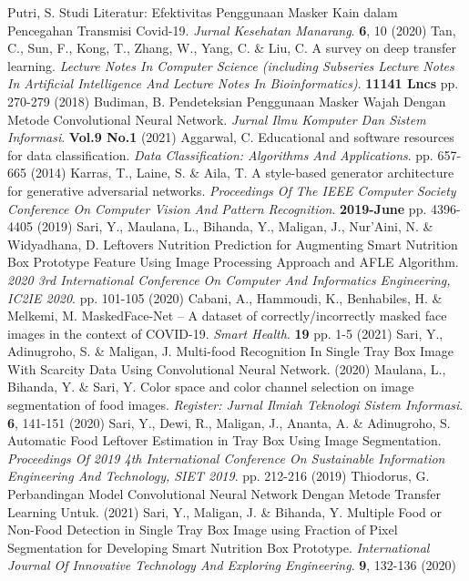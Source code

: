 \documentclass{article}
\begin{document}
\begin{thebibliography}{1}
	Putri, S. Studi Literatur: Efektivitas Penggunaan Masker Kain dalam Pencegahan Transmisi Covid-19. {\em Jurnal Kesehatan Manarang}. \textbf{6}, 10 (2020)
	Tan, C., Sun, F., Kong, T., Zhang, W., Yang, C. \& Liu, C. A survey on deep transfer learning. {\em Lecture Notes In Computer Science (including Subseries Lecture Notes In Artificial Intelligence And Lecture Notes In Bioinformatics)}. \textbf{11141 Lncs} pp. 270-279 (2018)
	Budiman, B. Pendeteksian Penggunaan Masker Wajah Dengan Metode Convolutional Neural Network. {\em Jurnal Ilmu Komputer Dan Sistem Informasi}. \textbf{Vol.9 No.1} (2021)
	Aggarwal, C. Educational and software resources for data classification. {\em Data Classification: Algorithms And Applications}. pp. 657-665 (2014)
	Karras, T., Laine, S. \& Aila, T. A style-based generator architecture for generative adversarial networks. {\em Proceedings Of The IEEE Computer Society Conference On Computer Vision And Pattern Recognition}. \textbf{2019-June} pp. 4396-4405 (2019)
	Sari, Y., Maulana, L., Bihanda, Y., Maligan, J., Nur'Aini, N. \& Widyadhana, D. Leftovers Nutrition Prediction for Augmenting Smart Nutrition Box Prototype Feature Using Image Processing Approach and AFLE Algorithm. {\em 2020 3rd International Conference On Computer And Informatics Engineering, IC2IE 2020}. pp. 101-105 (2020)
	Cabani, A., Hammoudi, K., Benhabiles, H. \& Melkemi, M. MaskedFace-Net – A dataset of correctly/incorrectly masked face images in the context of COVID-19. {\em Smart Health}. \textbf{19} pp. 1-5 (2021)
	Sari, Y., Adinugroho, S. \& Maligan, J. Multi-food Recognition In Single Tray Box Image With Scarcity Data Using Convolutional Neural Network.  (2020)
	Maulana, L., Bihanda, Y. \& Sari, Y. Color space and color channel selection on image segmentation of food images. {\em Register: Jurnal Ilmiah Teknologi Sistem Informasi}. \textbf{6}, 141-151 (2020)
	Sari, Y., Dewi, R., Maligan, J., Ananta, A. \& Adinugroho, S. Automatic Food Leftover Estimation in Tray Box Using Image Segmentation. {\em Proceedings Of 2019 4th International Conference On Sustainable Information Engineering And Technology, SIET 2019}. pp. 212-216 (2019)
	Thiodorus, G. Perbandingan Model Convolutional Neural Network Dengan Metode Transfer Learning Untuk.  (2021)
	Sari, Y., Maligan, J. \& Bihanda, Y. Multiple Food or Non-Food Detection in Single Tray Box Image using Fraction of Pixel Segmentation for Developing Smart Nutrition Box Prototype. {\em International Journal Of Innovative Technology And Exploring Engineering}. \textbf{9}, 132-136 (2020)

\end{thebibliography}
\end{document}
